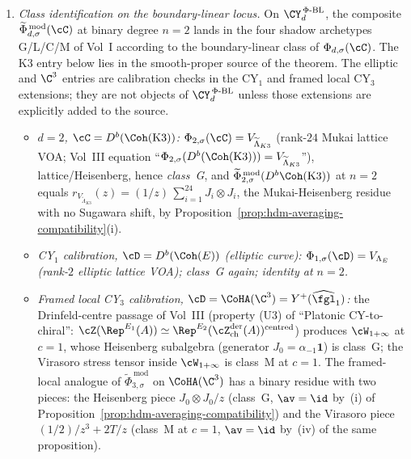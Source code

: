 \begin{theorem}
\begin{enumerate}[label=\textup{(\roman*)}]
\item \emph{Class identification on the boundary-linear locus.} On
 $\CY_d^{\,\Phi\text{-BL}}$, the composite
 $\widetilde\Phi_{d,\sigma}^{\,\mathrm{mod}}(\cC)$ at binary degree $n=2$
 lands in the four shadow archetypes G/L/C/M of Vol~I according to
 the boundary-linear class of $\Phi_{d,\sigma}(\cC)$. The K3 entry
 below lies in the smooth-proper source of the theorem. The elliptic
 and $\C^3$ entries are calibration checks in the CY$_1$ and framed
 local CY$_3$ extensions; they are not objects of
 $\CY_d^{\,\Phi\text{-BL}}$ unless those extensions are explicitly
 added to the source.
 \begin{itemize}[leftmargin=1.2em]
 \item \emph{$d = 2$, $\cC = D^b(\Coh(\mathrm{K3}))$:}
 $\Phi_{2,\sigma}(\cC) = V_{\widetilde\Lambda_{K3}}$ \textup{(}rank-$24$
 Mukai lattice VOA; Vol~III equation
 ``$\Phi_{2,\sigma}(D^b(\Coh(\mathrm{K3}))) = V_{\widetilde\Lambda_{K3}}$''\textup{)},
 lattice/Heisenberg, hence \emph{class~G}, and
 $\widetilde\Phi_{2,\sigma}^{\,\mathrm{mod}}(D^b\Coh(\mathrm{K3}))$ at
 $n=2$ equals
 $r_{V_{\widetilde\Lambda_{K3}}}(z) = (1/z)\,
 \sum_{i=1}^{24} J_i \otimes J_i$, the Mukai-Heisenberg residue
 with no Sugawara shift, by
 Proposition~\textup{\ref{prop:hdm-averaging-compatibility}}\textup{(i).}
 \item \emph{CY$_1$ calibration, $\cD = D^b(\Coh(E))$
 \textup{(}elliptic curve\textup{):}
 $\Phi_{1,\sigma}(\cD) = V_{\Lambda_E}$
 \textup{(}rank-$2$ elliptic lattice VOA\textup{);} class~G again;
 identity at $n=2$.}
 \item \emph{Framed local CY$_3$ calibration,
 $\cD = \CoHA(\C^3) = Y^+(\widehat{\fgl}_1)$:}
 the Drinfeld-centre passage of Vol~III \textup{(}property
 \textup{(U3)} of ``Platonic CY-to-chiral'': $\cZ(\Rep^{E_1}(A))
 \simeq \Rep^{E_2}(\cZ^{\mathrm{der}}_{\mathrm{ch}}(A))^{\mathrm{centred}}$\textup{)}
 produces $\cW_{1+\infty}$ at $c=1$, whose Heisenberg subalgebra
 \textup{(}generator $J_0 = \alpha_{-1}\mathbf{1}$\textup{)} is class~G;
 the Virasoro stress tensor inside $\cW_{1+\infty}$ is class~M at
 $c=1$. The framed-local analogue of
 $\widetilde\Phi_{3,\sigma}^{\,\mathrm{mod}}$ on $\CoHA(\C^3)$ has a
 binary residue with two pieces: the Heisenberg piece
 $J_0 \otimes J_0 / z$ \textup{(}class~G, $\av = \id$ by~\textup{(i)}
 of Proposition~\textup{\ref{prop:hdm-averaging-compatibility}}\textup{)} and
 the Virasoro piece $(1/2)/z^3 + 2T/z$ \textup{(}class~M at $c = 1$,
 $\av = \id$ by~\textup{(iv)} of the same proposition\textup{).}
 \end{itemize}

\end{enumerate}
\end{theorem}

